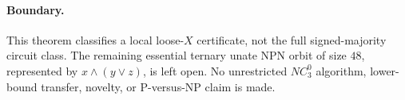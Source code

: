 \documentclass[11pt]{article}
\begin{document}
\paragraph{Boundary.}
This theorem classifies a local loose-$X$ certificate, not the full
signed-majority circuit class. The remaining essential ternary unate NPN orbit
of size $48$, represented by $x\wedge(y\vee z)$, is left open. No unrestricted
$NC^0_3$ algorithm, lower-bound transfer, novelty, or P-versus-NP claim is made.
\end{document}
